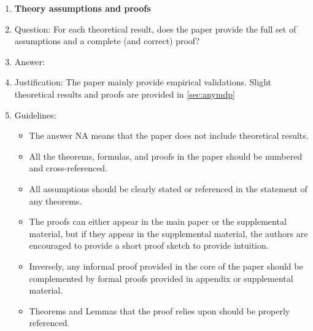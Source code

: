 \documentclass{article}
\begin{document}
\begin{enumerate}
\item {\bf Theory assumptions and proofs}
    \item[] Question: For each theoretical result, does the paper provide the full set of assumptions and a complete (and correct) proof?
    \item[] Answer: \answerYes{} %
    \item[] Justification: The paper mainly provide empirical validations. Slight theoretical results and proofs are provided in \cref{sec:anymdp}
    \item[] Guidelines: 
    \begin{itemize}
        \item The answer NA means that the paper does not include theoretical results. 
        \item All the theorems, formulas, and proofs in the paper should be numbered and cross-referenced.
        \item All assumptions should be clearly stated or referenced in the statement of any theorems.
        \item The proofs can either appear in the main paper or the supplemental material, but if they appear in the supplemental material, the authors are encouraged to provide a short proof sketch to provide intuition. 
        \item Inversely, any informal proof provided in the core of the paper should be complemented by formal proofs provided in appendix or supplemental material.
        \item Theorems and Lemmas that the proof relies upon should be properly referenced. 
    \end{itemize}


\end{enumerate}
\end{document}

